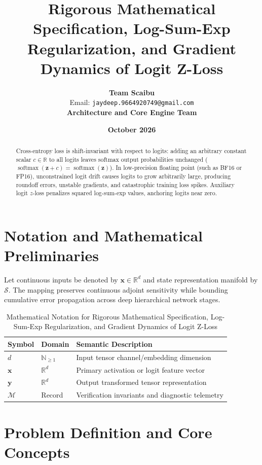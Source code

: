 \documentclass[11pt,a4paper]{article}
\title{\textbf{Rigorous Mathematical Specification, Log-Sum-Exp Regularization, and Gradient Dynamics of Logit Z-Loss}}
\author{\textbf{Team Scaibu} \\ \small Email: \texttt{jaydeep.9664920749@gmail.com} \\ \small \textbf{Architecture and Core Engine Team}}
\date{\textbf{October 2026}}
\theoremstyle{definition}
\begin{document}
\maketitle

\begin{abstract}
Cross-entropy loss is shift-invariant with respect to logits: adding an arbitrary constant scalar $c \in \mathbb{R}$ to all logits leaves softmax output probabilities unchanged ($\operatorname{softmax}(\mathbf{z} + c) = \operatorname{softmax}(\mathbf{z})$). In low-precision floating point (such as BF16 or FP16), unconstrained logit drift causes logits to grow arbitrarily large, producing roundoff errors, unstable gradients, and catastrophic training loss spikes. Auxiliary logit $z$-loss penalizes squared log-sum-exp values, anchoring logits near zero.
\end{abstract}

\section{Notation and Mathematical Preliminaries}

Let continuous inputs be denoted by $\mathbf{x} \in \mathbb{R}^d$ and state representation manifold by $\mathcal{S}$. The mapping preserves continuous adjoint sensitivity while bounding cumulative error propagation across deep hierarchical network stages.

\begin{table}[h]
\centering
\caption{Mathematical Notation for Rigorous Mathematical Specification, Log-Sum-Exp Regularization, and Gradient Dynamics of Logit Z-Loss}
\begin{tabular}{lll}
\toprule
\textbf{Symbol} & \textbf{Domain} & \textbf{Semantic Description} \\
\midrule
$d$ & $\mathbb{N}_{\ge 1}$ & Input tensor channel/embedding dimension \\
$\mathbf{x}$ & $\mathbb{R}^d$ & Primary activation or logit feature vector \\
$\mathbf{y}$ & $\mathbb{R}^d$ & Output transformed tensor representation \\
$\mathcal{M}$ & Record & Verification invariants and diagnostic telemetry \\
\bottomrule
\end{tabular}
\end{table}

\section{Problem Definition and Core Concepts}
\end{document}
